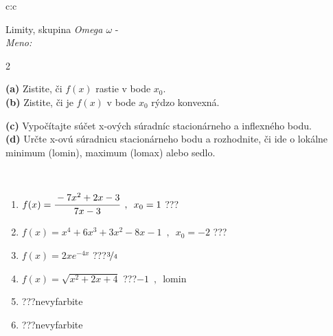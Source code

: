 \documentclass[10pt]{report}
\begin{document}
\begin{tabular}{c:c}
\begin{minipage}[c][104.5mm][t]{0.5\linewidth}
\begin{center}
\vspace{7mm}
{\huge Limity, skupina \textit{Omega $\omega$} -}\\[5mm]
\textit{Meno:}\phantom{xxxxxxxxxxxxxxxxxxxxxxxxxxxxxxxxxxxxxxxxxxxxxxxxxxxxxxxxxxxxxxxxx}\\[5mm]
\begin{minipage}{0.95\linewidth}
\begin{center}
{\small \begin{multicols}{2} \raggedright
\textbf{(a)} Zistite, či \(f(x)\) rastie v bode \(x_0\). \\[1mm]
\textbf{(b)} Zistite, či je \(f(x)\) v bode \(x_0\) rýdzo konvexná. \par \columnbreak
\textbf{(c)} Vypočítajte súčet x-ových súradníc stacionárneho a inflexného bodu. \\[1mm]
\textbf{(d)} Určte x-ovú súradnicu stacionárneho bodu a rozhodnite, či ide o lokálne minimum (lomin), maximum (lomax) alebo sedlo. \\[1mm]
\end{multicols}
}
\end{center}
\end{minipage}
\\[4mm]
\begin{minipage}{0.79\linewidth}
\begin{center}
\begin{varwidth}{\linewidth}
\begin{enumerate}
\normalsize
\item $f(x)=\cfrac{-7x^2+2x-3}{7x-3}\enspace , \enspace x_0=1$\quad \dotfill\; ???\;\dotfill \quad {}
\item $f(x)=x^4+6x^3+3x^2-8x-1\enspace , \enspace x_0=-2$\quad \dotfill\; ???\;\dotfill \quad {}
\item $f(x)=2xe^{-4x}$\quad \dotfill\; ???\;\dotfill \quad $\nicefrac{3}{4}$
\item $f(x)=\sqrt{x^2+2x+4}$\quad \dotfill\; ???\;\dotfill \quad $-1\enspace , \enspace\text{lomin}$
\item \quad \dotfill\; ???\;\dotfill \quad nevyfarbite
\item \quad \dotfill\; ???\;\dotfill \quad nevyfarbite
\end{enumerate}
\end{varwidth}
\end{center}

\end{minipage}
\end{center}
\end{minipage}
\end{tabular}
\end{document}
